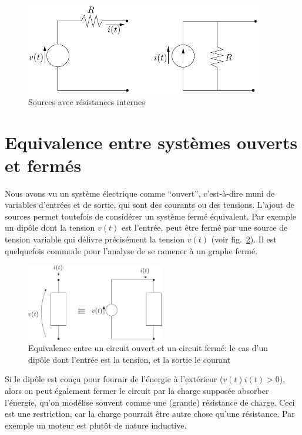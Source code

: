\begin{figure}[t]
\begin{center}
\includegraphics[height=4cm]{resint}
\caption{Sources avec résistances internes}
\label{fig:resint}
\end{center}
\end{figure}


\section{Equivalence entre systèmes ouverts et fermés}

Nous avons vu un système électrique comme ``ouvert'', c'est-à-dire muni de variables d'entrées et de sortie, qui sont des courants ou des tensions. L'ajout de sources permet toutefois de considérer un système fermé équivalent. Par exemple un dipôle dont la tension $v(t)$ est l'entrée, peut être fermé par une source de tension variable qui délivre précisément la tension $v(t)$ (voir fig.~\ref{fig:equivouvertferme}). Il est quelquefois commode pour l'analyse de se ramener à un graphe fermé.


\begin{figure}[htbp]
\begin{center}
\includegraphics[width=6cm]{equivouvertferme}
\caption{Equivalence entre un circuit ouvert et un circuit fermé: le cas d'un dipôle dont l'entrée est la tension, et la sortie le courant}
\label{fig:equivouvertferme}
\end{center}
\end{figure}

Si le dipôle est conçu pour fournir de l'énergie à l'extérieur ($v(t) i(t) >0$), alors on peut également fermer le circuit par la charge supposée absorber l'énergie, qu'on modélise souvent comme une (grande) résistance de charge. Ceci est une restriction, car la charge pourrait être autre chose qu'une résistance. Par exemple un moteur est plutôt de nature inductive.

